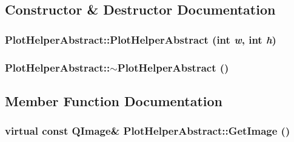 \subsection{Constructor \& Destructor Documentation}
\hypertarget{class_plot_helper_abstract_5ce8f74da753d9b322667da23dfcadca}{
\subsubsection[{PlotHelperAbstract}]{\setlength{\rightskip}{0pt plus 5cm}PlotHelperAbstract::PlotHelperAbstract (int {\em w}, \/  int {\em h})}}
\label{class_plot_helper_abstract_5ce8f74da753d9b322667da23dfcadca}


\hypertarget{class_plot_helper_abstract_2cec5e5f0f338763d67b4c08cfa0418f}{
\subsubsection[{$\sim$PlotHelperAbstract}]{\setlength{\rightskip}{0pt plus 5cm}PlotHelperAbstract::$\sim$PlotHelperAbstract ()}}
\label{class_plot_helper_abstract_2cec5e5f0f338763d67b4c08cfa0418f}




\subsection{Member Function Documentation}
\hypertarget{class_plot_helper_abstract_63305b07bebbbaa71cedbf8e05d05dfa}{
\subsubsection[{GetImage}]{\setlength{\rightskip}{0pt plus 5cm}virtual const QImage\& PlotHelperAbstract::GetImage ()}}
\label{class_plot_helper_abstract_63305b07bebbbaa71cedbf8e05d05dfa}




